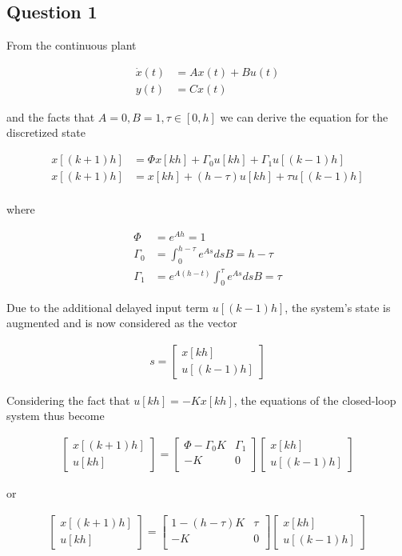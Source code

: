 \subsection{Question 1}

From the continuous plant

\begin{align*}
  \dot{x}(t) &= Ax(t) + Bu(t) \\
        y(t) &= Cx(t)
\end{align*}

and the facts that $A=0, B=1, \tau \in [0,h]$ we can derive the equation for the
discretized state

\begin{align*}
  x[(k+1)h] &= \Phi x[kh] + \Gamma_0 u[kh] + \Gamma_1 u[(k-1)h] \\
  x[(k+1)h] &= x[kh] + (h-\tau)u[kh] + \tau u[(k-1)h] \\
\end{align*}

where

\begin{align*}
  \Phi      &= e^{Ah} = 1 \\
  \Gamma_0  &= \int_{0}^{h-\tau} e^{As} ds B = h-\tau \\
  \Gamma_1  &= e^{A(h-t)} \int_{0}^{\tau} e^{As} ds B = \tau
\end{align*}

Due to the additional delayed input term $u[(k-1)h]$, the system's state is
augmented and is now considered as the vector

\begin{align*}
  s =
  \begin{bmatrix}
    x[kh] \\
    u[(k-1)h]
  \end{bmatrix}
\end{align*}

Considering the fact that $u[kh] = -K x[kh]$, the equations of the closed-loop
system thus become

\begin{align*}
  \begin{bmatrix}
    x[(k+1)h] \\
    u[kh]
  \end{bmatrix}
  =
  \begin{bmatrix}
    \Phi - \Gamma_0 K & \Gamma_1 \\
    -K                & 0 \\
  \end{bmatrix}
  \begin{bmatrix}
    x[kh] \\
    u[(k-1)h]
  \end{bmatrix}
\end{align*}

or

\begin{align*}
  \begin{bmatrix}
    x[(k+1)h] \\
    u[kh]
  \end{bmatrix}
  =
  \begin{bmatrix}
    1 - (h-\tau)K & \tau \\
    -K            & 0 \\
  \end{bmatrix}
  \begin{bmatrix}
    x[kh] \\
    u[(k-1)h]
  \end{bmatrix}
\end{align*}
